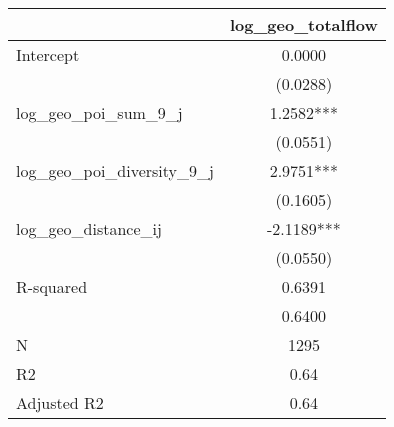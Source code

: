 \begin{table}
\caption{}
\begin{center}
\begin{tabular}{lc}
\hline
                               & log\_geo\_totalflow  \\
\midrule
Intercept                      & 0.0000               \\
                               & (0.0288)             \\
log\_geo\_poi\_sum\_9\_j       & 1.2582***            \\
                               & (0.0551)             \\
log\_geo\_poi\_diversity\_9\_j & 2.9751***            \\
                               & (0.1605)             \\
log\_geo\_distance\_ij         & -2.1189***           \\
                               & (0.0550)             \\
R-squared                      & 0.6391               \\
                               & 0.6400               \\
N                              & 1295                 \\
R2                             & 0.64                 \\
Adjusted R2                    & 0.64                 \\
\hline
\end{tabular}
\end{center}
\end{table}